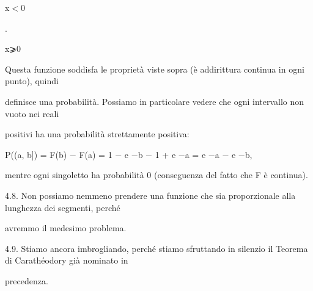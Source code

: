 \documentclass[a4paper,portrait,12pt]{article}
\begin{document}
\begin{flushleft}
x$<$0
\end{flushleft}


.


\begin{flushleft}
x⩾0
\end{flushleft}





\begin{flushleft}
Questa funzione soddisfa le propriet\`{a} viste sopra (\`{e} addirittura continua in ogni punto), quindi
\end{flushleft}


\begin{flushleft}
definisce una probabilit\`{a}. Possiamo in particolare vedere che ogni intervallo non vuoto nei reali
\end{flushleft}


\begin{flushleft}
positivi ha una probabilit\`{a} strettamente positiva:
\end{flushleft}


\begin{flushleft}
P((a, b]) = F(b) $-$ F(a) = 1 $-$ e $-$b $-$ 1 + e $-$a = e $-$a $-$ e $-$b,
\end{flushleft}


\begin{flushleft}
mentre ogni singoletto ha probabilit\`{a} 0 (conseguenza del fatto che F \`{e} continua).
\end{flushleft}


\begin{flushleft}
4.8. Non possiamo nemmeno prendere una funzione che sia proporzionale alla lunghezza dei segmenti, perch\'{e}
\end{flushleft}


\begin{flushleft}
avremmo il medesimo problema.
\end{flushleft}


\begin{flushleft}
4.9. Stiamo ancora imbrogliando, perch\'{e} stiamo sfruttando in silenzio il Teorema di Carath\'{e}odory gi\`{a} nominato in
\end{flushleft}


\begin{flushleft}
precedenza.
\end{flushleft}
\end{document}
